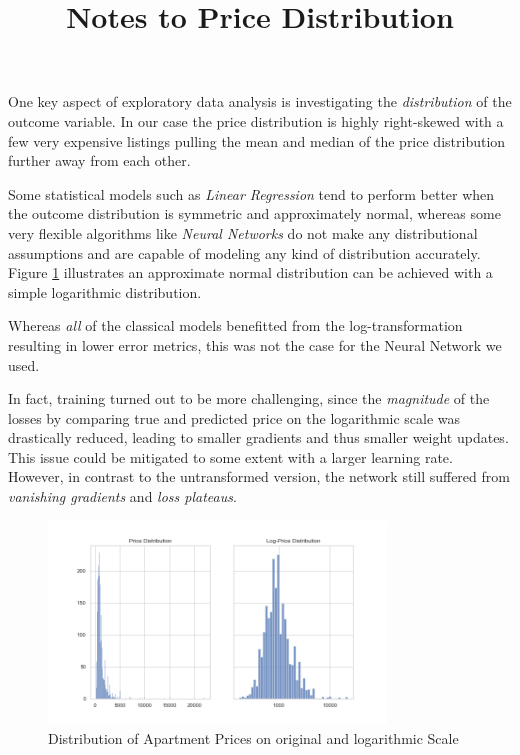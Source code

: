 \documentclass[12pt, letterpaper]{article}
\title{Notes to Price Distribution}
\author{}
\date{}
\begin{document}
\maketitle

One key aspect of exploratory data analysis is investigating the \emph{distribution} of the outcome variable.
In our case the price distribution is highly right-skewed with a few very expensive listings pulling the mean and median of the price distribution further away from each other.

Some statistical models such as \emph{Linear Regression} tend to perform better when the outcome distribution is symmetric and approximately normal, whereas some very flexible algorithms like \emph{Neural Networks} do not make any distributional assumptions and are capable of modeling any kind of distribution accurately.
Figure \ref{fig:price-distribution} illustrates an approximate normal distribution can be achieved with a simple logarithmic distribution.

Whereas \emph{all} of the classical models benefitted from the log-transformation resulting in lower error metrics, this was not the case for the Neural Network we used.

In fact, training turned out to be more challenging, since the \emph{magnitude} of the losses by comparing true and predicted price on the logarithmic scale was drastically reduced, leading to smaller gradients and thus smaller weight updates.
This issue could be mitigated to some extent with a larger learning rate.
However, in contrast to the untransformed version, the network still suffered from \emph{vanishing gradients} and \emph{loss plateaus}.

\newpage




\appendix

\begin{figure}[t]
    \centering
    \includegraphics[width=0.8\textwidth]{price_distribution.png}
    \caption{Distribution of Apartment Prices on original and logarithmic Scale}
    \label{fig:price-distribution}
\end{figure}
\end{document}
